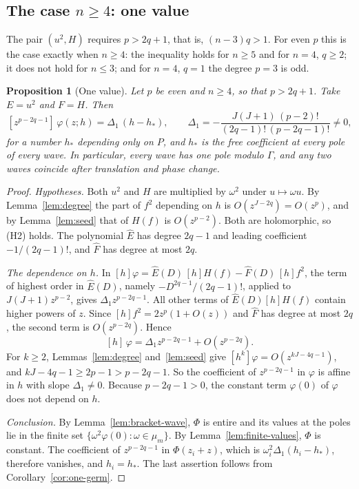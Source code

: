 \documentclass[11pt]{article}
\newtheorem{proposition}[theorem]{Proposition}
\theoremstyle{definition}
\theoremstyle{remark}
\numberwithin{equation}{section}
\newcommand{\hatt}[1]{\widehat{#1}}
\begin{document}
\subsection{\texorpdfstring{The case \(n\ge4\): one value}{The case n >= 4: one value}}\label{sec:affine}

The pair \((u^2,H)\) requires \(p>2q+1\), that is, \((n-3)q>1\). For
even \(p\) this is the case exactly when \(n\ge4\): the inequality
holds for \(n\ge5\) and for \(n=4\), \(q\ge2\); it does not hold for
\(n\le3\); and for \(n=4\), \(q=1\) the degree \(p=3\) is odd.

\begin{proposition}[One value]\label{prop:affine}
Let \(p\) be even and \(n\ge4\), so that \(p>2q+1\).
Take \(E=u^2\) and \(F=H\). Then
\[
 [z^{p-2q-1}]\,\varphi(z;h)=\Delta_1\,(h-h_*),\qquad
 \Delta_1=-\frac{J(J+1)\,(p-2)!}{(2q-1)!\,(p-2q-1)!}\ne0,
\]
for a number \(h_*\) depending only on \(P\), and \(h_*\) is the free
coefficient at every pole of every wave. In particular, every wave has
one pole modulo \(\Gamma\), and any two waves coincide after
translation and phase change.
\end{proposition}

\begin{proof}
\emph{Hypotheses.} Both \(u^2\) and \(H\) are multiplied by
\(\omega^2\) under \(u\mapsto\omega u\). By Lemma~\ref{lem:degree} the
part of \(f^2\) depending on \(h\) is \(O(z^{J-2q})=O(z^p)\), and by
Lemma~\ref{lem:seed} that of \(H(f)\) is \(O(z^{p-2})\). Both are
holomorphic, so (H2) holds. The polynomial \(\hatt E\) has degree
\(2q-1\) and leading coefficient \(-1/(2q-1)!\), and \(\hatt F\) has
degree at most \(2q\).

\emph{The dependence on \(h\).} In
\([h]\varphi=\hatt E(D)\,[h]H(f)-\hatt F(D)\,[h]f^2\), the term of
highest order in \(\hatt E(D)\), namely \(-D^{2q-1}/(2q-1)!\), applied to
\(J(J+1)z^{p-2}\), gives \(\Delta_1z^{p-2q-1}\). All other terms of
\(\hatt E(D)[h]H(f)\) contain higher powers of \(z\). Since
\([h]f^2=2z^p(1+O(z))\) and \(\hatt F\) has degree at most \(2q\), the
second term is \(O(z^{p-2q})\). Hence
\[
 [h]\,\varphi=\Delta_1z^{p-2q-1}+O(z^{p-2q}).
\]
For \(k\ge2\), Lemmas~\ref{lem:degree} and~\ref{lem:seed} give
\([h^k]\varphi=O(z^{kJ-4q-1})\), and \(kJ-4q-1\ge2p-1>p-2q-1\). So the
coefficient of \(z^{p-2q-1}\) in \(\varphi\) is affine in \(h\) with
slope \(\Delta_1\ne0\). Because \(p-2q-1>0\), the constant term
\(\varphi(0)\) of \(\varphi\) does not depend on \(h\).

\emph{Conclusion.} By Lemma~\ref{lem:bracket-wave}, \(\Phi\) is
entire and its values at the poles lie in the finite set
\(\{\omega^2\varphi(0):\omega\in\mu_m\}\). By
Lemma~\ref{lem:finite-values}, \(\Phi\) is constant. The coefficient of
\(z^{p-2q-1}\) in \(\Phi(z_i+z)\), which is
\(\omega_i^2\Delta_1(h_i-h_*)\), therefore vanishes, and \(h_i=h_*\).
The last assertion follows from Corollary~\ref{cor:one-germ}.
\end{proof}
\end{document}
